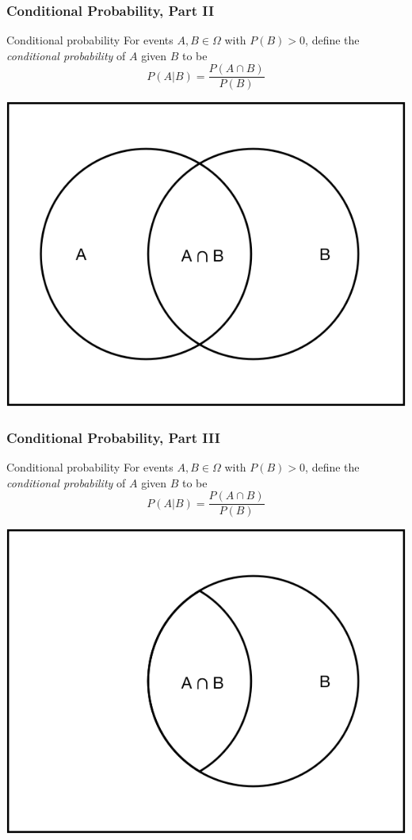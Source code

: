 \documentclass[12pt, block=fill]{beamer}
\begin{document}
\begin{frame}
  \frametitle{Conditional Probability, Part II}
  \begin{block}{Conditional probability}
    For events $A, B \in \Omega$ with $P(B) > 0$, define the \textit{conditional
      probability} of $A$ given $B$ to be
    \[
      P(A|B) = \frac{P(A \cap B)}{P(B)}
      \]
    \end{block}
    \begin{center} 
      \includegraphics[width = 0.5\linewidth]{./figures/a_and_b}
    \end{center} 
\end{frame}

\begin{frame}
  \frametitle{Conditional Probability, Part III}
  \begin{block}{Conditional probability}
    For events $A, B \in \Omega$ with $P(B) > 0$, define the \textit{conditional
      probability} of $A$ given $B$ to be
    \[
      P(A|B) = \frac{P(A \cap B)}{P(B)}
      \]
    \end{block}
    \begin{center} 
      \includegraphics[width = 0.5\linewidth]{./figures/a_given_b}
    \end{center} 
\end{frame}
\end{document}
